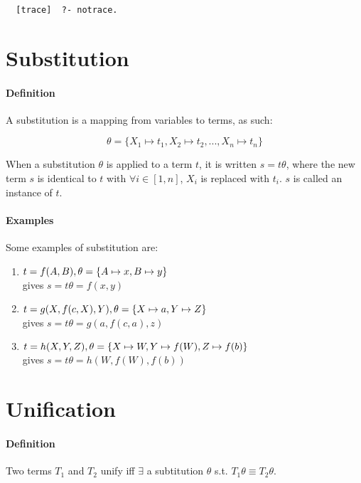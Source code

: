 \documentclass{article}
\begin{document}
\begin{multicols}{2}
  \begin{lstlisting}
  [trace]  ?- notrace.
  \end{lstlisting}
  
  \section{Substitution}
  
  \paragraph{Definition} A substitution is a mapping from variables to terms, as such:
  
  $$\theta = \{ X_1 \mapsto t_1, X_2 \mapsto t_2, ..., X_n \mapsto t_n \}$$
  
  When a substitution $\theta$ is applied to a term $t$, it is written $s = t\theta$, where the new term $s$ is identical to $t$ with $\forall i \in [1, n]$, $X_i$ is replaced with $t_i$. $s$ is called an instance of $t$.
  
  \paragraph{Examples} Some examples of substitution are:
  
  \begin{enumerate}
  \item $t = f(A,B),\\ \theta = \{A \mapsto x, B \mapsto y\}$\\ gives $s=t\theta=f(x, y)$
  \item $t = g(X, f(c, X), Y),\\ \theta = \{X \mapsto a, Y \mapsto Z\}$\\ gives $s=t\theta=g(a, f(c, a), z)$
  \item $t = h(X, Y, Z),\\ \theta = \{X \mapsto W, Y \mapsto f(W), Z \mapsto f(b)\}$\\ gives $s=t\theta=h(W, f(W), f(b))$
  \end{enumerate}
  
  \section{Unification}
  
  \paragraph{Definition} Two terms $T_1$ and $T_2$ unify iff $\exists$ a subtitution $\theta$ s.t. $T_1\theta \equiv T_2\theta$.
  

\end{multicols}
\end{document}
